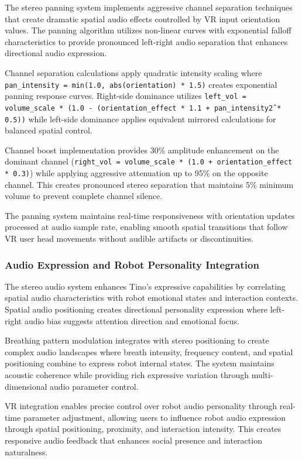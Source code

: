 The stereo panning system implements aggressive channel separation techniques that create dramatic spatial audio effects controlled by VR input orientation values. The panning algorithm utilizes non-linear curves with exponential falloff characteristics to provide pronounced left-right audio separation that enhances directional audio expression.

Channel separation calculations apply quadratic intensity scaling where \texttt{pan\_intensity = min(1.0, abs(orientation) * 1.5)} creates exponential panning response curves. Right-side dominance utilizes \texttt{left\_vol = volume\_scale * (1.0 - (orientation\_effect * 1.1 + pan\_intensity\^2 * 0.5))} while left-side dominance applies equivalent mirrored calculations for balanced spatial control.

Channel boost implementation provides 30\% amplitude enhancement on the dominant channel (\texttt{right\_vol = volume\_scale * (1.0 + orientation\_effect * 0.3)}) while applying aggressive attenuation up to 95\% on the opposite channel. This creates pronounced stereo separation that maintains 5\% minimum volume to prevent complete channel silence.

The panning system maintains real-time responsiveness with orientation updates processed at audio sample rate, enabling smooth spatial transitions that follow VR user head movements without audible artifacts or discontinuities.

\subsubsection{Audio Expression and Robot Personality Integration}

The stereo audio system enhances Tino's expressive capabilities by correlating spatial audio characteristics with robot emotional states and interaction contexts. Spatial audio positioning creates directional personality expression where left-right audio bias suggests attention direction and emotional focus.

Breathing pattern modulation integrates with stereo positioning to create complex audio landscapes where breath intensity, frequency content, and spatial positioning combine to express robot internal states. The system maintains acoustic coherence while providing rich expressive variation through multi-dimensional audio parameter control.

VR integration enables precise control over robot audio personality through real-time parameter adjustment, allowing users to influence robot audio expression through spatial positioning, proximity, and interaction intensity. This creates responsive audio feedback that enhances social presence and interaction naturalness.

